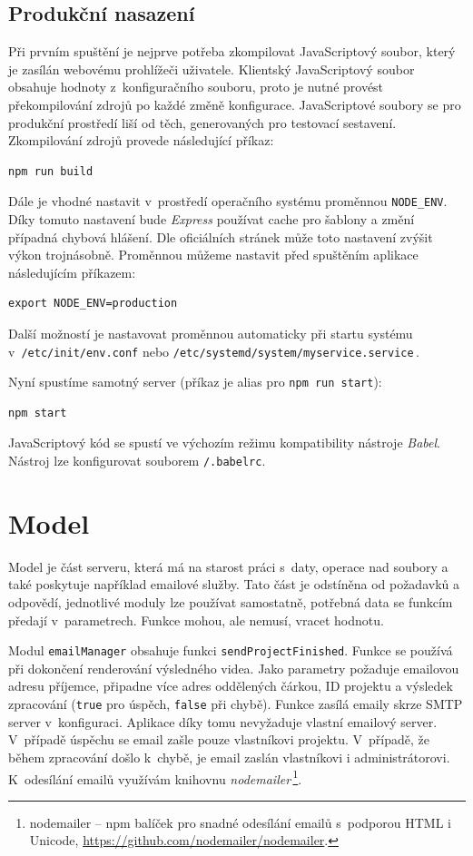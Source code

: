 \subsection{Produkční nasazení}
Při prvním spuštění je nejprve potřeba zkompilovat JavaScriptový soubor, který je zasílán webovému prohlížeči uživatele. Klientský JavaScriptový soubor obsahuje hodnoty z~konfiguračního souboru, proto je nutné provést překompilování zdrojů po každé změně konfigurace. JavaScriptové soubory se pro produkční prostředí liší od těch, generovaných pro testovací sestavení. Zkompilování zdrojů provede následující příkaz:
\begin{lstlisting}[style=bash]
npm run build
\end{lstlisting}

Dále je vhodné nastavit v~prostředí operačního systému proměnnou \texttt{NODE\_ENV}. Díky tomuto nastavení bude \textit{Express} používat cache pro šablony a změní případná chybová hlášení. Dle oficiálních stránek může toto nastavení zvýšit výkon trojnásobně. Proměnnou můžeme nastavit před spuštěním aplikace následujícím příkazem:
\begin{lstlisting}[style=bash]
export NODE_ENV=production
\end{lstlisting}
Další možností je nastavovat proměnnou automaticky při startu systému v~\texttt{/etc/init/env.conf} nebo \texttt{/etc/systemd/system/myservice.service}\,\cite{express}.

Nyní spustíme samotný server (příkaz je alias pro \texttt{npm run start}):
\begin{lstlisting}[style=bash]
npm start
\end{lstlisting}
JavaScriptový kód se spustí ve výchozím režimu kompatibility nástroje \textit{Babel}. Nástroj lze konfigurovat souborem \texttt{/.babelrc}.

\section{Model}
Model je část serveru, která má na starost práci s~daty, operace nad soubory a také poskytuje například emailové služby. Tato část je odstíněna od požadavků a odpovědí, jednotlivé moduly lze používat samostatně, potřebná data se funkcím předají v~parametrech. Funkce mohou, ale nemusí, vracet hodnotu.

Modul \texttt{emailManager} obsahuje funkci \texttt{sendProjectFinished}. Funkce se používá při dokončení renderování výsledného videa. Jako parametry požaduje emailovou adresu příjemce, připadne více adres oddělených čárkou, ID projektu a výsledek zpracování (\texttt{true} pro úspěch, \texttt{false} při chybě). Funkce zasílá emaily skrze SMTP server v~konfiguraci. Aplikace díky tomu nevyžaduje vlastní emailový server. V~případě úspěchu se email zašle pouze vlastníkovi projektu. V~případě, že během zpracování došlo k~chybě, je email zaslán vlastníkovi i administrátorovi. K~odesílání emailů využívám knihovnu \textit{nodemailer}\,\footnote{nodemailer -- npm balíček pro snadné odesílání emailů s~podporou HTML i Unicode, \url{https://github.com/nodemailer/nodemailer}.}.

